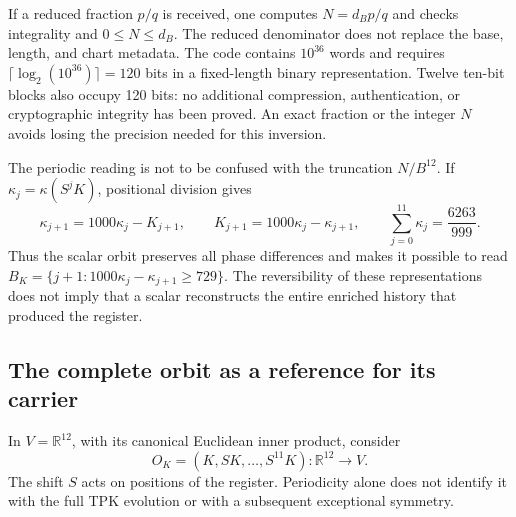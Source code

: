 If a reduced fraction \(p/q\) is received, one computes \(N=d_Bp/q\) and checks integrality and \(0\leq N\leq d_B\). The reduced denominator does not replace the base, length, and chart metadata. The code contains \(10^{36}\) words and requires \(\lceil\log_2(10^{36})\rceil=120\) bits in a fixed-length binary representation. Twelve ten-bit blocks also occupy 120 bits: no additional compression, authentication, or cryptographic integrity has been proved. An exact fraction or the integer \(N\) avoids losing the precision needed for this inversion.

The periodic reading is not to be confused with the truncation \(N/B^{12}\). If \(\kappa_j=\kappa(S^jK)\), positional division gives
\begin{equation}
 \kappa_{j+1}=1000\kappa_j-K_{j+1},\qquad
 K_{j+1}=1000\kappa_j-\kappa_{j+1},\qquad
 \sum_{j=0}^{11}\kappa_j=\frac{6263}{999}.
 \label{lib01:orbita-kappa}
\end{equation}
Thus the scalar orbit preserves all phase differences and makes it possible to read \(B_K=\{j+1:1000\kappa_j-\kappa_{j+1}\geq729\}\). The reversibility of these representations does not imply that a scalar reconstructs the entire enriched history that produced the register.

\subsection{The complete orbit as a reference for its carrier}
\label{lib01:orbita}

In \(V=\mathbb R^{12}\), with its canonical Euclidean inner product, consider
\[
 O_K=(K,SK,\ldots,S^{11}K):\mathbb R^{12}\longrightarrow V.
\]
The shift \(S\) acts on positions of the register. Periodicity alone does not identify it with the full TPK evolution or with a subsequent exceptional symmetry.

